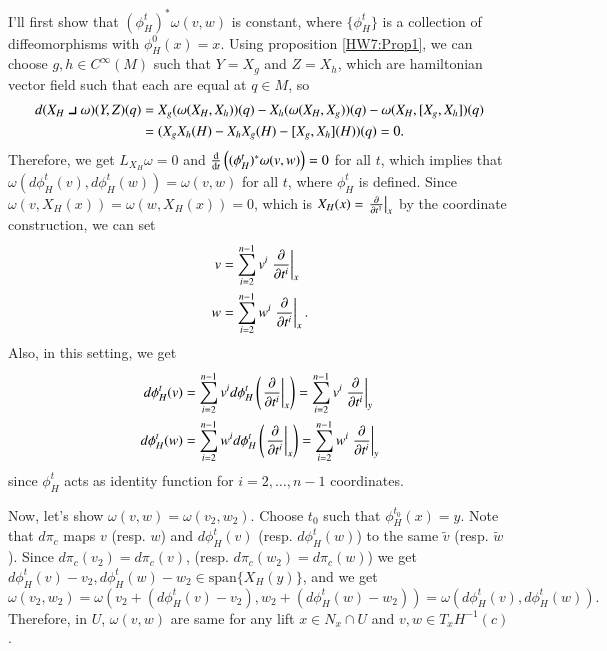 \documentclass[a4paper, 12pt]{article}
\theoremstyle{Mydefinition}
\theoremstyle{Mytheorem}
\newcommand{\intprodl}{%
    \mathbin{\scalebox{1.5}{$\lrcorner$}}%
}
\begin{document}
\begin{enumerate}
I'll first show that $(\phi^t_H)^*\omega(v,w)$ is constant, where $\{\phi^t_H\}$ is a collection of diffeomorphisms with $\phi^0_H(x) = x$. Using proposition \ref{HW7:Prop1}, we can choose $g,h\in C^\infty(M)$ such that $Y=X_g$ and $Z=X_h$, which are hamiltonian vector field such that each are equal at $q\in M$, so
\begin{equation*}
\begin{split}
    d(X_H\intprodl \omega)(Y, Z)(q) &= X_g(\omega(X_H, X_h))(q) - X_h(\omega(X_H, X_g))(q) - \omega(X_H, [X_g,X_h])(q)\\
    &=(X_gX_h(H) - X_hX_g(H) - [X_g,X_h](H))(q) = 0.
\end{split}
\end{equation*}
Therefore, we get $L_{X_H}\omega = 0$ and $\dv{t}\left((\phi^t_H)^*\omega(v,w)\right) = 0$ for all $t$, which implies that $\omega (d\phi^t_H(v), d\phi^t_H(w)) = \omega(v,w)$ for all $t$, where $\phi^t_H$ is defined. Since $\omega(v, X_H(x)) = \omega(w, X_H(x)) = 0$, which is $X_H(x) = \left.\pdv{t^1}\right|_x$ by the coordinate construction, we can set
\begin{equation*}
    \begin{split}
        v &= \sum_{i=2}^{n-1}v^i\left.\pdv{t^i}\right|_x\\
        w &= \sum_{i=2}^{n-1}w^i\left.\pdv{t^i}\right|_x.
    \end{split}
\end{equation*}
Also, in this setting, we get
\begin{equation*}
    \begin{split}
        d\phi^t_H(v) &= \sum_{i=2}^{n-1}v^id\phi^t_H\left(\left.\pdv{t^i}\right|_x\right) = \sum_{i=2}^{n-1}v^i\left.\pdv{t^i}\right|_y\\
        d\phi^t_H(w) &= \sum_{i=2}^{n-1}w^id\phi^t_H\left(\left.\pdv{t^i}\right|_x\right) = \sum_{i=2}^{n-1}w^i\left.\pdv{t^i}\right|_y
    \end{split}
\end{equation*}
since $\phi^t_H$ acts as identity function for $i=2, \ldots, n-1$ coordinates.

Now, let's show $\omega(v,w) = \omega(v_2, w_2)$. Choose $t_0$ such that $\phi_H^{t_0}(x) = y$. Note that $d\pi_c$ maps $v$ (resp. $w$) and $d\phi_H^t(v)$ (resp. $d\phi_H^t(w)$) to the same $\tilde{v}$ (resp. $\tilde{w}$). Since $d\pi_c(v_2) = d\pi_c(v)$, (resp. $d\pi_c(w_2)=d\pi_c(w)$) we get $d\phi_H^t(v)-v_2, d\phi_H^t(w)-w_2\in \mathrm{span}\{X_H(y)\}$, and we get 
\begin{equation*}
    \omega(v_2, w_2) = \omega(v_2 + (d\phi_H^t(v)-v_2), w_2 + (d\phi_H^t(w)-w_2)) = \omega(d\phi_H^t(v), d\phi_H^t(w)).
\end{equation*}
Therefore, in $U$, $\omega(v,w)$ are same for any lift $x\in N_x\cap U$ and $v,w\in T_xH^{-1}(c)$.


\end{enumerate}
\end{document}
